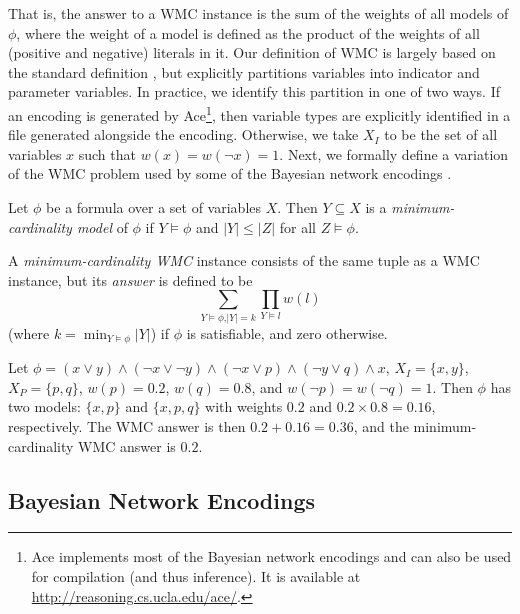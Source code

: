 That is, the answer to a WMC instance is the sum of the weights of all models of
$\phi$, where the weight of a model is defined as the product of the weights of
all (positive and negative) literals in it. Our definition of WMC is largely
based on the standard definition \citep{DBLP:journals/ai/ChaviraD08}, but
explicitly partitions variables into indicator and parameter variables. In
practice, we identify this partition in one of two ways. If an encoding is
generated by \textsf{Ace}\footnote{\textsf{Ace}
  \citep{DBLP:journals/ai/ChaviraD08} implements most of the Bayesian network
  encodings and can also be used for compilation (and thus inference). It is
  available at \url{http://reasoning.cs.ucla.edu/ace/}.}, then variable types
are explicitly identified in a file generated alongside the encoding. Otherwise,
we take $X_I$ to be the set of all variables $x$ such that $w(x) = w(\neg x) =
1$. Next, we formally define a variation of the WMC problem used by some of the
Bayesian network encodings
\citep{DBLP:conf/ijcai/ChaviraD05,DBLP:conf/sat/ChaviraD06}.

\begin{definition}
  Let $\phi$ be a formula over a set of variables $X$. Then $Y \subseteq X$ is a
  \emph{minimum-cardinality model} of $\phi$ if $Y \models \phi$ and $|Y| \le
  |Z|$ for all $Z \models \phi$.
\end{definition}

\begin{definition} \label{def:mcwmc}
  A \emph{minimum-cardinality WMC} instance consists of the same tuple as a WMC
  instance, but its \emph{answer} is defined to be
  \[
  \sum_{Y \models \phi\text{,}|Y| = k} \prod_{Y \models l} w(l)
  \]
  (where $k = \min_{Y \models \phi} |Y|$) if $\phi$ is satisfiable, and zero otherwise.
\end{definition}

\begin{example} \label{example:1}
  Let $\phi = (x \lor y) \land (\neg x \lor \neg y) \land (\neg x \lor p) \land
  (\neg y \lor q) \land x$, $X_I = \{ x, y \}$, $X_P = \{ p, q \}$, $w(p) =
  0.2$, $w(q) = 0.8$, and $w(\neg p) = w(\neg q) = 1$. Then $\phi$ has two
  models: $\{x, p\}$ and $\{ x, p, q \}$ with weights $0.2$ and $0.2 \times 0.8
  = 0.16$, respectively. The WMC answer is then $0.2 + 0.16 = 0.36$, and the
  minimum-cardinality WMC answer is $0.2$.
\end{example}

\subsection{Bayesian Network Encodings} \label{sec:encodings}

